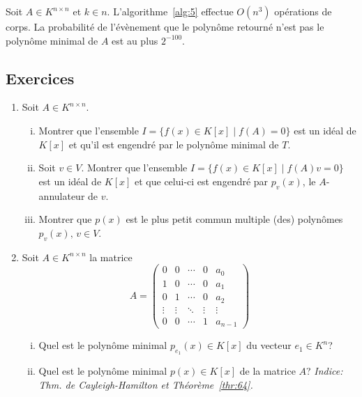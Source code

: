 \begin{theorem}
  \label{thr:62}
  Soit $A ∈ K^{n ×n}$ et $k ∈ n$. L'algorithme~\ref{alg:5} effectue $O(n^3)$ opérations de corps. La probabilité de l'évènement que le polynôme retourné n'est pas le polynôme minimal de $A$ est au plus $2^{-100}$. 
\end{theorem}

     
   
   \subsection*{Exercices}
   \begin{enumerate}
   \item Soit  $A ∈ K^{ n ×n}$. 
     \begin{enumerate}[i)]
     \item        Montrer que l'ensemble $I = \{ f(x) \in K[x] \mid f(A) = 0\}$ est un idéal de $K[x]$ et qu'il est engendré par le polynôme minimal de $T$.      \label{item:1}
     \item   Soit $v \in V$. Montrer que l'ensemble $I = \{ f(x) \in K[x] \mid f(A)v = 0\}$ est un idéal de $K[x]$ et que celui-ci est engendré par $p_v(x)$, le $A$-annulateur de $v$. \label{item:2}
     \item Montrer que $p(x)$ est le plus petit commun multiple (des) polynômes $p_v(x), \, v \in V$. \label{item:3}     
     \end{enumerate}
   \item Soit $A ∈ K^{n ×n}$ la matrice
     \begin{displaymath}
       A =
       \begin{pmatrix}
         0 & 0 & \cdots    & 0 & a_0 \\
         1 & 0 & \cdots    & 0 & a_1 \\
         0 & 1 & \cdots    & 0 & a_2 \\
         \vdots & \vdots & \ddots & \vdots & \vdots \\
         0 & 0 & \cdots    & 1 & a_{n-1}
       \end{pmatrix}
     \end{displaymath}
     \begin{enumerate}[i)]  
     \item Quel est le polynôme minimal $p_{e_1}(x)∈ K[x]$ du vecteur $e_1 ∈ K^n$?
     \item Quel est le polynôme minimal $p(x)∈ K[x]$ de la matrice $A$?
       \emph{ Indice: Thm. de Cayleigh-Hamilton et Théorème~\ref{thr:64}. } 
     \end{enumerate}
       
 \end{enumerate}


